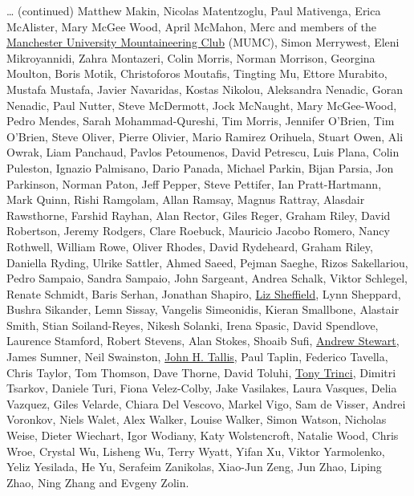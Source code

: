 \documentclass[
]{book}
\begin{document}
\ldots{} (continued) Matthew Makin, Nicolas Matentzoglu, Paul Mativenga, Erica McAlister, Mary McGee Wood, April McMahon, Merc and members of the \href{https://www.mumc.me.uk/wordpress}{Manchester University Mountaineering Club} (MUMC), Simon Merrywest, Eleni Mikroyannidi, Zahra Montazeri, Colin Morris, Norman Morrison, Georgina Moulton, Boris Motik, Christoforos Moutafis, Tingting Mu, Ettore Murabito, Mustafa Mustafa, Javier Navaridas, Kostas Nikolou, Aleksandra Nenadic, Goran Nenadic, Paul Nutter, Steve McDermott, Jock McNaught, Mary McGee-Wood, Pedro Mendes, Sarah Mohammad-Qureshi, Tim Morris, Jennifer O'Brien, Tim O'Brien, Steve Oliver, Pierre Olivier, Mario Ramirez Orihuela, Stuart Owen, Ali Owrak, Liam Panchaud, Pavlos Petoumenos, David Petrescu, Luis Plana, Colin Puleston, Ignazio Palmisano, Dario Panada, Michael Parkin, Bijan Parsia, Jon Parkinson, Norman Paton, Jeff Pepper, Steve Pettifer, Ian Pratt-Hartmann, Mark Quinn, Rishi Ramgolam, Allan Ramsay, Magnus Rattray, Alasdair Rawsthorne, Farshid Rayhan, Alan Rector, Giles Reger, Graham Riley, David Robertson, Jeremy Rodgers, Clare Roebuck, Mauricio Jacobo Romero, Nancy Rothwell, William Rowe, Oliver Rhodes, David Rydeheard, Graham Riley, Daniella Ryding, Ulrike Sattler, Ahmed Saeed, Pejman Saeghe, Rizos Sakellariou, Pedro Sampaio, Sandra Sampaio, John Sargeant, Andrea Schalk, Viktor Schlegel, Renate Schmidt, Baris Serhan, Jonathan Shapiro, \href{https://uk.linkedin.com/in/liz-sheffield-70573040}{Liz Sheffield}, Lynn Sheppard, Bushra Sikander, Lemn Sissay, Vangelis Simeonidis, Kieran Smallbone, Alastair Smith, Stian Soiland-Reyes, Nikesh Solanki, Irena Spasic, David Spendlove, Laurence Stamford, Robert Stevens, Alan Stokes, Shoaib Sufi, \href{https://github.com/ajstewartlang}{Andrew Stewart}, James Sumner, Neil Swainston, \href{https://doi.org/10.1002/jqs.3390060408}{John H. Tallis}, Paul Taplin, Federico Tavella, Chris Taylor, Tom Thomson, Dave Thorne, David Toluhi, \href{https://www.theguardian.com/science/2020/nov/10/tony-trinci-obituary}{Tony Trinci}, Dimitri Tsarkov, Daniele Turi, Fiona Velez-Colby, Jake Vasilakes, Laura Vasques, Delia Vazquez, Giles Velarde, Chiara Del Vescovo, Markel Vigo, Sam de Visser, Andrei Voronkov, Niels Walet, Alex Walker, Louise Walker, Simon Watson, Nicholas Weise, Dieter Wiechart, Igor Wodiany, Katy Wolstencroft, Natalie Wood, Chris Wroe, Crystal Wu, Lisheng Wu, Terry Wyatt, Yifan Xu, Viktor Yarmolenko, Yeliz Yesilada, He Yu, Serafeim Zanikolas, Xiao-Jun Zeng, Jun Zhao, Liping Zhao, Ning Zhang and Evgeny Zolin.
\end{document}
